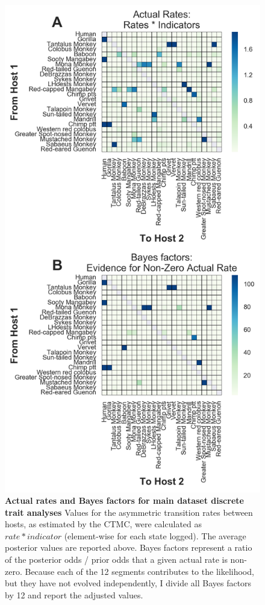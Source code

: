 \begin{figure}[ht!]
  \begin{centering}
    \includegraphics[width=.55\linewidth]{./png/siv_maindata_transmissions.png}
  	\caption[Pairwise host transmission rates (`main' dataset)]{\textbf{Actual rates and Bayes factors for main dataset discrete trait analyses }
Values for the asymmetric transition rates between hosts, as estimated by the CTMC, were calculated as $rate * indicator$ (element-wise for each state logged).
The average posterior values are reported above.
Bayes factors represent a ratio of the posterior odds / prior odds that a given actual rate is non-zero.
Because each of the 12 segments contributes to the likelihood, but they have not evolved independently, I divide all Bayes factors by 12 and report the adjusted values.
        }
  	\label{siv_maindata_transmissions}
  \end{centering}
\end{figure}

